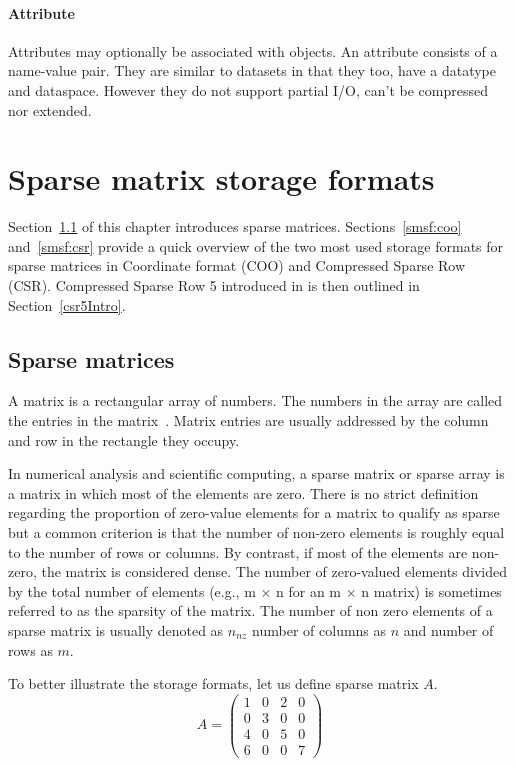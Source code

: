 \documentclass[thesis=M,english]{FITthesis}[2019/12/23]
\begin{document}
\subsubsection{Attribute}

Attributes may optionally be associated with objects. An attribute consists of a name-value pair.
They are similar to datasets in that they too, have a datatype and dataspace. However they do not
support partial I/O, can't be compressed nor extended.


\chapter{Sparse matrix storage formats}

Section~\ref{smsf:spm} of this chapter introduces sparse matrices. Sections~\ref{smsf:coo} and~\ref{smsf:csr}
provide a quick overview of the two most used storage formats for sparse matrices in Coordinate format (COO)
and Compressed Sparse Row (CSR). Compressed Sparse Row 5 introduced in \cite{liu2015csr5} is then outlined
in Section~\ref{csr5Intro}.


\section{Sparse matrices}\label{smsf:spm}

A matrix is a rectangular array of numbers. The numbers in the array
are called the entries in the matrix~\cite{anton14}. Matrix entries are usually addressed
by the column and row in the rectangle they occupy.

In numerical analysis and scientific computing, a sparse matrix or sparse array
is a matrix in which most of the elements are zero. There is no strict definition
regarding the proportion of zero-value elements for a matrix to qualify as sparse
but a common criterion is that the number of non-zero elements is roughly equal
to the number of rows or columns. By contrast, if most of the elements are non-zero,
the matrix is considered dense.
The number of zero-valued elements divided by the total number of elements (e.g., m × n for an m × n matrix) is sometimes referred to as the sparsity of the matrix.
\cite{efficientSDMM} The number of non zero elements of a sparse matrix is usually denoted
as \(n_{nz}\) number of columns as \(n\) and number of rows as \(m\).

To better illustrate the storage formats, let us define sparse matrix \(A\).
\begin{equation*}
    A =
    \begin{pmatrix}
        1 & 0 & 2 & 0 \\
        0 & 3 & 0 & 0 \\
        4 & 0 & 5 & 0 \\
        6 & 0 & 0 & 7
    \end{pmatrix}
\end{equation*}
\end{document}

